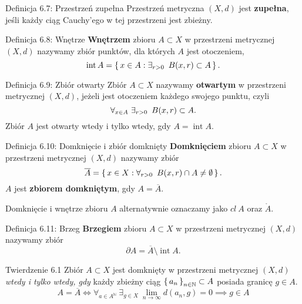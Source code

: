 \documentclass{article}
\newcommand{\hquad}{\mkern9mu}
\newcommand{\N}{\mathbb{N}}
\newcommand{\lin}[1]{\lim\limits_{n\to\infty}{#1}}
\newcommand*\closure[1]{\overline{#1}}
\DeclareMathOperator{\interior}{int}
\newcommand{\seq}[1]{\set{#1_n}_{n\in\N}}
\begin{document}
\begin{defr}{Definicja 6.7: Przestrzeń zupełna}
    Przestrzeń metryczna $(X,d)$ jest \textbf{zupełna}, jeśli każdy ciąg Cauchy'ego w tej przestrzeni jest zbieżny.
\end{defr}

\begin{defr}{Definicja 6.8: Wnętrze}
    \textbf{Wnętrzem} zbioru $A\subset X$ w przestrzeni metrycznej $(X,d)$ nazywamy zbiór punktów, dla których $A$
    jest otoczeniem,
    \begin{equation*}
        \interior{A}=\set{x\in A:\exists_{r>0}\hquad B(x,r)\subset A}.
    \end{equation*}
\end{defr}

\begin{defr}{Definicja 6.9: Zbiór otwarty}
    Zbiór $A\subset X$ nazywamy \textbf{otwartym} w przestrzeni metrycznej $(X,d)$,
    jeżeli jest otoczeniem każdego swojego punktu, czyli
    \begin{equation*}
        \forall_{x\in A}\ \exists_{r>0}\hquad B(x,r)\subset A.
    \end{equation*}
    Zbiór $A$ jest otwarty wtedy i tylko wtedy, gdy $A=\interior{A}$.
\end{defr}

\begin{defr}{Definicja 6.10: Domknięcie i zbiór domknięty}
    \textbf{Domknięciem} zbioru $A\subset X$ w przestrzeni metrycznej $(X,d)$ nazywamy zbiór
    \begin{equation*}
        \closure{A}=\set{x\in X:\forall_{r>0}\hquad B(x,r)\cap A\neq\emptyset}.
    \end{equation*}
    $A$ jest \textbf{zbiorem domkniętym}, gdy $A=\closure{A}$.
\end{defr}

Domknięcie i wnętrze zbioru $A$ alternatywnie oznaczamy jako $cl\ A$ oraz $\mathring{A}$.

\begin{defr}{Definicja 6.11: Brzeg}
    \textbf{Brzegiem} zbioru $A\subset X$ w przestrzeni metrycznej $(X,d)$ nazywamy zbiór
    \begin{equation*}
        \partial{A}=\closure{A}\setminus\interior{A}.
    \end{equation*}
\end{defr}

\begin{twier}{Twierdzenie 6.1}
    Zbiór $A\subset X$ jest domknięty w przestrzeni metrycznej $(X,d)$ \textit{wtedy i tylko wtedy, gdy} każdy zbieżny ciąg $\seq{a}\subset A$
    posiada granicę $g\in A$.
    \begin{equation*}
        A=\closure{A}\iff\forall_{a\in A^\N}\ \exists_{g\in X}\ \lin{d(a_n,g)=0}\implies g\in A
    \end{equation*}
\end{twier}
\end{document}
